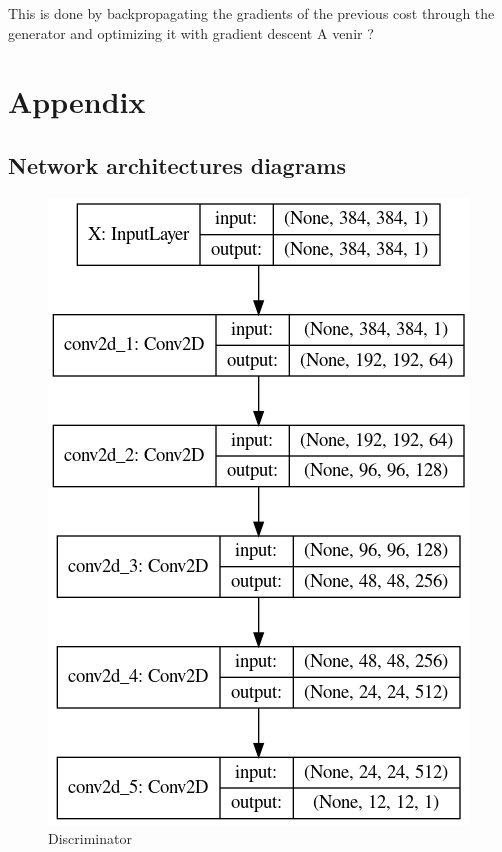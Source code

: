 \documentclass{article}
\begin{document}
	This is done by backpropagating the gradients of the previous cost through the generator and optimizing it with gradient descent
	A venir ?


\newpage
\section{Appendix}

	\subsection{Network architectures diagrams}
	
		\begin{figure}
			\centering
			\includegraphics[scale=0.4]{discriminator.png}
			\caption{Discriminator}
		\end{figure}
	
\end{document}
